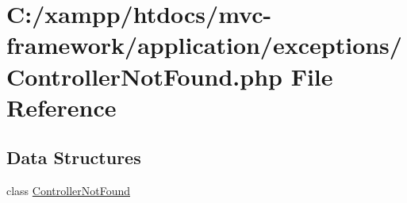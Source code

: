 \hypertarget{_controller_not_found_8php}{}\section{C\+:/xampp/htdocs/mvc-\/framework/application/exceptions/\+Controller\+Not\+Found.php File Reference}
\label{_controller_not_found_8php}
\subsection*{Data Structures}
\begin{DoxyCompactItemize}
\item 
class \hyperlink{class_controller_not_found}{Controller\+Not\+Found}
\end{DoxyCompactItemize}
